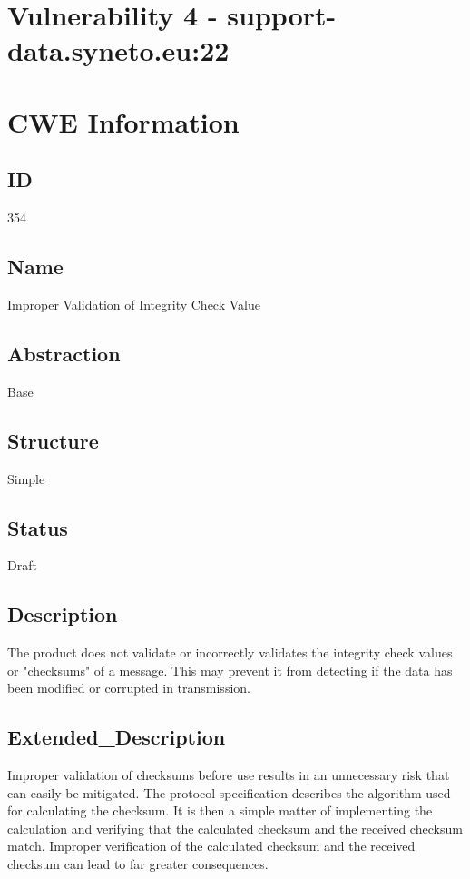 \section*{Vulnerability 4 - support-data.syneto.eu:22}

\section*{CWE Information}
\subsection*{ID}
354

\subsection*{Name}
Improper Validation of Integrity Check Value

\subsection*{Abstraction}
Base

\subsection*{Structure}
Simple

\subsection*{Status}
Draft

\subsection*{Description}
The product does not validate or incorrectly validates the integrity check values or "checksums" of a message. This may prevent it from detecting if the data has been modified or corrupted in transmission.

\subsection*{Extended\_Description}
Improper validation of checksums before use results in an unnecessary risk that can easily be mitigated. The protocol specification describes the algorithm used for calculating the checksum. It is then a simple matter of implementing the calculation and verifying that the calculated checksum and the received checksum match. Improper verification of the calculated checksum and the received checksum can lead to far greater consequences.


